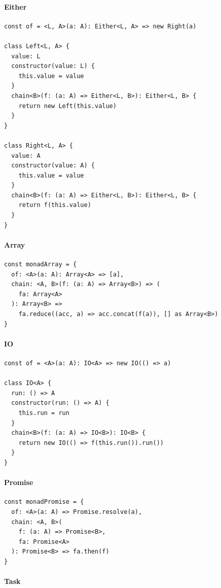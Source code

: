 \documentclass[12pt]{article}
\begin{document}
\paragraph{Either}

\begin{verbatim}
const of = <L, A>(a: A): Either<L, A> => new Right(a)

class Left<L, A> {
  value: L
  constructor(value: L) {
    this.value = value
  }
  chain<B>(f: (a: A) => Either<L, B>): Either<L, B> {
    return new Left(this.value)
  }
}

class Right<L, A> {
  value: A
  constructor(value: A) {
    this.value = value
  }
  chain<B>(f: (a: A) => Either<L, B>): Either<L, B> {
    return f(this.value)
  }
}
\end{verbatim}

\paragraph{Array}

\begin{verbatim}
const monadArray = {
  of: <A>(a: A): Array<A> => [a],
  chain: <A, B>(f: (a: A) => Array<B>) => (
    fa: Array<A>
  ): Array<B> =>
    fa.reduce((acc, a) => acc.concat(f(a)), [] as Array<B>)
}
\end{verbatim}

\paragraph{IO}

\begin{verbatim}
const of = <A>(a: A): IO<A> => new IO(() => a)

class IO<A> {
  run: () => A
  constructor(run: () => A) {
    this.run = run
  }
  chain<B>(f: (a: A) => IO<B>): IO<B> {
    return new IO(() => f(this.run()).run())
  }
}
\end{verbatim}

\paragraph{Promise}

\begin{verbatim}
const monadPromise = {
  of: <A>(a: A) => Promise.resolve(a),
  chain: <A, B>(
    f: (a: A) => Promise<B>,
    fa: Promise<A>
  ): Promise<B> => fa.then(f)
}
\end{verbatim}

\paragraph{Task}
\end{document}
